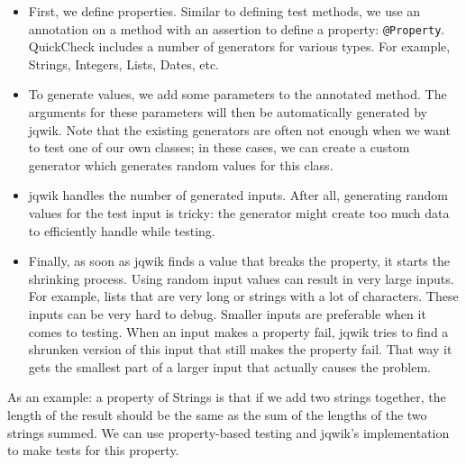 \begin{itemize}
\item
  First, we define properties. Similar to defining test methods, we use
  an annotation on a method with an assertion to define a property:
  \texttt{@Property}. QuickCheck includes a number of generators for
  various types. For example, Strings, Integers, Lists, Dates, etc.
\item
  To generate values, we add some parameters to the annotated method.
  The arguments for these parameters will then be automatically
  generated by jqwik. Note that the existing generators are often not
  enough when we want to test one of our own classes; in these cases, we
  can create a custom generator which generates random values for this
  class.
\item
  jqwik handles the number of generated inputs. After all, generating
  random values for the test input is tricky: the generator might create
  too much data to efficiently handle while testing.
\item
  Finally, as soon as jqwik finds a value that breaks the property, it
  starts the shrinking process. Using random input values can result in
  very large inputs. For example, lists that are very long or strings
  with a lot of characters. These inputs can be very hard to debug.
  Smaller inputs are preferable when it comes to testing. When an input
  makes a property fail, jqwik tries to find a shrunken version of this
  input that still makes the property fail. That way it gets the
  smallest part of a larger input that actually causes the problem.
\end{itemize}

As an example: a property of Strings is that if we add two strings
together, the length of the result should be the same as the sum of the
lengths of the two strings summed. We can use property-based testing and
jqwik's implementation to make tests for this property.

\begin{Shaded}
\begin{Highlighting}[]
 

   \NormalTok{(}  

\NormalTok{());}
\NormalTok{  \}}
\NormalTok{\}}
\end{Highlighting}
\end{Shaded}

